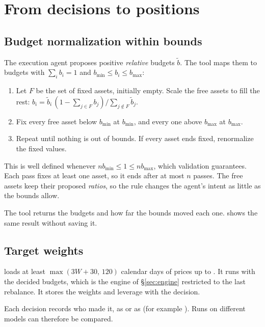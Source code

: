 \documentclass[11pt,a4paper]{article}
\makeatletter
\newcommand{\snippetsource}[1]{\csname snippet@#1\endcsname}
\newcommand{\snippet}[3]{%
  }
\makeatother
\begin{document}
\section{From decisions to positions}\label{sec:decisions}

\subsection{Budget normalization within bounds}
The execution agent proposes positive \emph{relative} budgets $\tilde b$. The tool
 maps them to budgets with $\sum_ib_i=1$ and
$b_{\min}\le b_i\le b_{\max}$:
\begin{enumerate}
  \item Let $F$ be the set of fixed assets, initially empty. Scale the free assets to fill
        the rest: $b_i=\tilde b_i\,(1-\sum_{j\in F}b_j)/\sum_{j\notin F}\tilde b_j$.
  \item Fix every free asset below $b_{\min}$ at $b_{\min}$, and every one above $b_{\max}$
        at $b_{\max}$.
  \item Repeat until nothing is out of bounds. If every asset ends fixed, renormalize the
        fixed values.
\end{enumerate}
This is well defined whenever $nb_{\min}\le1\le nb_{\max}$, which validation guarantees.
Each pass fixes at least one asset, so it ends after at most $n$ passes. The free assets
keep their proposed \emph{ratios}, so the rule changes the agent's intent as little as the
bounds allow.

The tool returns the budgets and how far the bounds moved each one. 
shows the same result without saving it.
\snippet{project_budgets}{Python}{Budget normalization}
\snippet{set_risk_budgets}{Python}{The decision tool}

\subsection{Target weights}
 loads at least
$\max(3W+30,\,120)$ calendar days of prices up to . It runs
 with the decided budgets, which is the engine of
\S\ref{sec:engine} restricted to the last rebalance. It stores the weights and leverage
with the decision.

Each decision records who made it, as  or as
 (for example ). Runs on different
models can therefore be compared.
\snippet{compute_weights}{Python}{Budgets to target weights through the C++ engine}
\end{document}
